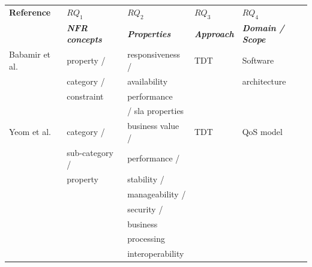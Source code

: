 \documentclass[english,12pt]{article}
\begin{document}
  
\begin{table}[ht!]
\centering
\small
\begin{tabular}{l|l|l|l|l}
  \hline 
  \hline
   \textbf{Reference}    & \textbf{$RQ_1$} &
   \textbf{$RQ_2$} & \textbf{$RQ_3$} &
   \textbf{$RQ_4$} 
   \\
                    & \textbf{\textit{NFR concepts}} &
   \textbf{\textit{Properties}} & \textbf{\textit{Approach}} &
   \textbf{\textit{Domain / Scope}} 
   \\
  \hline
  \hline  
  Babamir et al. \cite{Babamir2010} &  property / & responsiveness / & TDT & Software  \\
                                                       & category /  & availability           &         & architecture \\
                                                       & constraint  & performance        &         &  \\
                                                       &                  & / sla properties    &         &  \\  
  \hline   
  Yeom et al. \cite{Yeom2006}         & category /                    & business value /                   & TDT & QoS model\\ 
                                                       & sub-category /             & performance /                      &        &                  \\
                                                       & property                       & stability /                             &        &                  \\
                                                       &                                     & manageability /                    &        &                  \\
                                                       &                                     & security /                              &        &                  \\
                                                       &                                     & business                               &         &                  \\
                                                      &                                     &  processing                           &         &                  \\
                                                      &                                      & interoperability                     &        &                  \\ 

\end{tabular}
\end{table}
\end{document}
